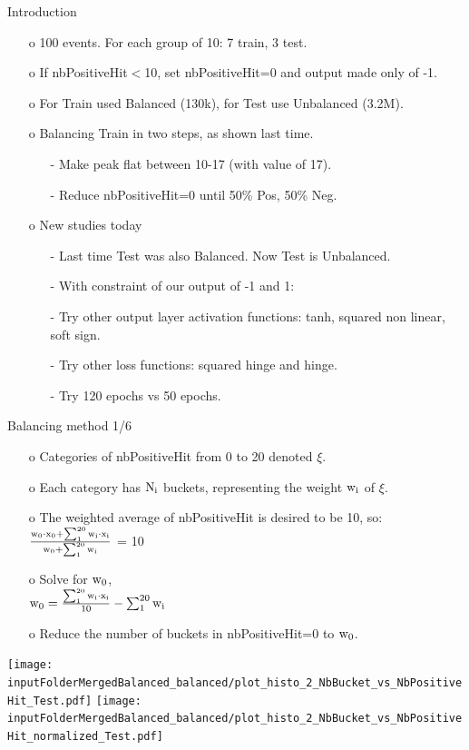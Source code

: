 \documentclass{beamer}
\begin{document}
\begin{frame}{Introduction}
\begin{enumerate}
\item[o] 100 events. For each group of 10: 7 train, 3 test.  
\item[o] If nbPositiveHit$<$10, set nbPositiveHit=0 and output made only of -1.
\item[o] For Train used Balanced (130k), for Test use Unbalanced (3.2M).
\item[o] Balancing Train in two steps, as shown last time.
\begin{enumerate}
\item[-] Make peak flat between 10-17 (with value of 17).
\item[-] Reduce nbPositiveHit=0 until 50\% Pos, 50\% Neg.
\end{enumerate}
\item[o] New studies today
 \begin{enumerate}
\item[-] Last time Test was also Balanced. Now Test is Unbalanced.
\item[-] With constraint of our output of -1 and 1: 
\item[-] Try other output layer activation functions: tanh, squared non linear, soft sign.
\item[-] Try other loss functions: squared hinge and hinge.
\item[-] Try 120 epochs vs 50 epochs.
\end{enumerate}

\end{enumerate}
\end{frame}
\clearpage



\begin{frame}{Balancing method 1/6}
\begin{enumerate}
\item[o] Categories of nbPositiveHit from 0 to 20 denoted $\xi$.
\item[o] Each category has $\Ni$ buckets, representing the weight $\wi$ of $\xi$.
\item[o] The weighted average of nbPositiveHit is desired to be 10, so: \\
$\frac{\wzero \cdot \xzero + \sum_{1}^{20} \wi \cdot \xi}{\wzero + \sum_{1}^{20} \wi}$ = 10
\item[o] Solve for $\wzero$, \\
$\wzero = \frac{ \sum_{1}^{20} \wi \cdot \xi}{10} - \sum_{1}^{20} \wi$
\item[o] Reduce the number of buckets in nbPositiveHit=0 to $\wzero$.
\end{enumerate}
\texttt{[image: \\inputFolderMergedBalanced\_balanced/plot\_histo\_2\_NbBucket\_vs\_NbPositiveHit\_Test.pdf]}
\texttt{[image: \\inputFolderMergedBalanced\_balanced/plot\_histo\_2\_NbBucket\_vs\_NbPositiveHit\_normalized\_Test.pdf]}
\end{frame}
\clearpage
\end{document}
